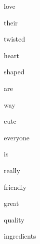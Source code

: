 \documentclass[varwidth]{standalone}
\begin{document}
 \begin{CJK*}{UTF8}{gbsn} 
{\setlength{\fboxsep}{0pt}\colorbox{white!0}{\parbox{0.9\textwidth}{
\colorbox{red!11.972731590270996}{\strut love} 
\colorbox{red!64.69029998779297}{\strut their} 
\colorbox{red!28.278278350830078}{\strut twisted} 
\colorbox{red!37.00727844238281}{\strut heart} 
\colorbox{red!37.07695007324219}{\strut shaped} 
\colorbox{red!40.87983703613281}{\strut are} 
\colorbox{red!58.91364288330078}{\strut way} 
\colorbox{red!33.99003601074219}{\strut cute} 
\colorbox{red!20.612239837646484}{\strut everyone} 
\colorbox{red!41.32581329345703}{\strut is} 
\colorbox{red!49.8646125793457}{\strut really} 
\colorbox{red!89.15293884277344}{\strut friendly} 
\colorbox{red!100.0}{\strut great} 
\colorbox{red!19.316255569458008}{\strut quality} 
\colorbox{red!0.0}{\strut ingredients} 

}}}\end{CJK*}
\end{document}
